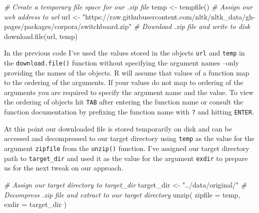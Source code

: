 \documentclass[
  letterpaper,
]{latex/krantz}
\newenvironment{Shaded}{\begin{snugshade}}{\end{snugshade}}
\newcommand{\AttributeTok}[1]{\textcolor[rgb]{0.00,0.00,0.00}{#1}}
\newcommand{\CommentTok}[1]{\textcolor[rgb]{0.00,0.00,0.00}{\textit{#1}}}
\newcommand{\FunctionTok}[1]{\textcolor[rgb]{0.00,0.00,0.00}{#1}}
\newcommand{\NormalTok}[1]{\textcolor[rgb]{0.00,0.00,0.00}{#1}}
\newcommand{\OtherTok}[1]{\textcolor[rgb]{0.00,0.00,0.00}{#1}}
\newcommand{\StringTok}[1]{\textcolor[rgb]{0.00,0.00,0.00}{#1}}
\begin{document}
\begin{Shaded}
\begin{Highlighting}[]
\CommentTok{\# Create a temporary file space for our .zip file}
\NormalTok{temp }\OtherTok{\textless{}{-}} \FunctionTok{tempfile}\NormalTok{()}
\CommentTok{\# Assign our web address to \textasciigrave{}url\textasciigrave{}}
\NormalTok{url }\OtherTok{\textless{}{-}} \StringTok{"https://raw.githubusercontent.com/nltk/nltk\_data/gh{-}pages/packages/corpora/switchboard.zip"}
\CommentTok{\# Download .zip file and write to disk}
\FunctionTok{download.file}\NormalTok{(url, temp)}
\end{Highlighting}
\end{Shaded}

\begin{tcolorbox}[enhanced jigsaw, colbacktitle=quarto-callout-warning-color!10!white, arc=.35mm, toprule=.15mm, breakable, colframe=quarto-callout-warning-color-frame, bottomrule=.15mm, opacitybacktitle=0.6, coltitle=black, titlerule=0mm, colback=white, toptitle=1mm, bottomtitle=1mm, title=\textcolor{quarto-callout-warning-color}{\faExclamationTriangle}\hspace{0.5em}{Tip}, rightrule=.15mm, leftrule=.75mm, opacityback=0, left=2mm]

In the previous code I've used the values stored in the objects
\texttt{url} and \texttt{temp} in the \texttt{download.file()} function
without specifying the argument names --only providing the names of the
objects. R will assume that values of a function map to the ordering of
the arguments. If your values do not map to ordering of the arguments
you are required to specify the argument name and the value. To view the
ordering of objects hit \texttt{TAB} after entering the function name or
consult the function documentation by prefixing the function name with
\texttt{?} and hitting \texttt{ENTER}.

\end{tcolorbox}

At this point our downloaded file is stored temporarily on disk and can
be accessed and decompressed to our target directory using \texttt{temp}
as the value for the argument \texttt{zipfile} from the \texttt{unzip()}
function. I've assigned our target directory path to
\texttt{target\_dir} and used it as the value for the argument
\texttt{exdir} to prepare us for the next tweak on our approach.

\begin{Shaded}
\begin{Highlighting}[]
\CommentTok{\# Assign our target directory to \textasciigrave{}target\_dir\textasciigrave{}}
\NormalTok{target\_dir }\OtherTok{\textless{}{-}} \StringTok{"../data/original/"}
\CommentTok{\# Decompress .zip file and extract to our target directory}
\FunctionTok{unzip}\NormalTok{(}
  \AttributeTok{zipfile =}\NormalTok{ temp,}
  \AttributeTok{exdir =}\NormalTok{ target\_dir}
\NormalTok{)}
\end{Highlighting}
\end{Shaded}
\end{document}
